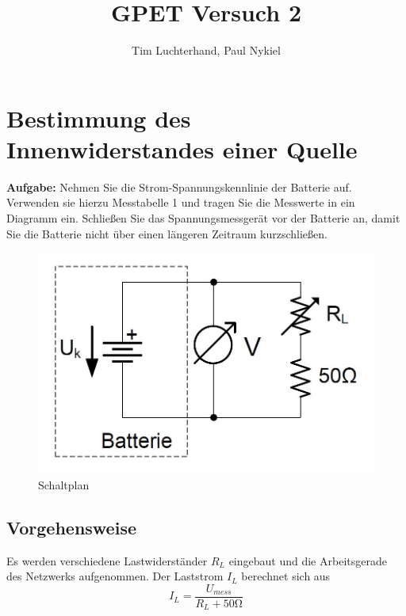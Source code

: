 \documentclass[10pt]{report}
\author{Tim Luchterhand, Paul Nykiel}
\title{GPET Versuch 2}
\begin{document}
        \maketitle

        \section{Bestimmung des Innenwiderstandes einer Quelle}
        \textbf{Aufgabe:} Nehmen Sie die Strom-Spannungskennlinie der Batterie auf. Verwenden sie hierzu Messtabelle
        1 und tragen Sie die Messwerte in ein Diagramm ein. Schließen Sie das Spannungsmessgerät
        vor der Batterie an, damit Sie die Batterie nicht über einen längeren
        Zeitraum kurzschließen.
		
		\begin{figure}[H]
            \includegraphics[width=\textwidth]{BatterieSchaltung.jpg}
          \caption{Schaltplan}
        \end{figure}

        \subsection{Vorgehensweise}
        Es werden verschiedene Lastwiderständer $R_L$ eingebaut und die Arbeitsgerade
        des Netzwerks aufgenommen. Der Laststrom $I_L$ berechnet sich aus
        \begin{equation*}
            I_L = \frac{U_{mess}}{R_L + 50\si{\ohm}}
        \end{equation*}


        \vspace{0.5cm}
\end{document}
